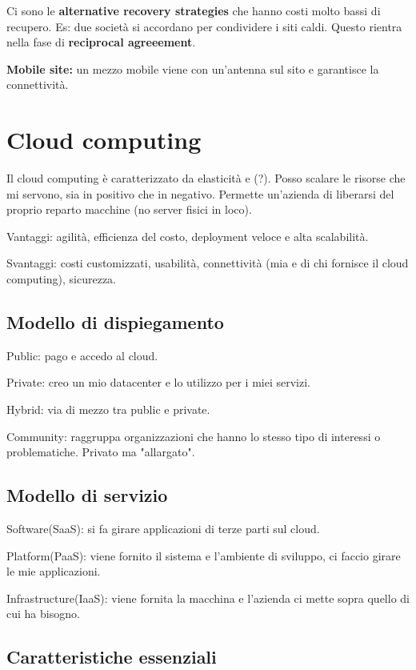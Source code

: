 Ci sono le \textbf{alternative recovery strategies} che hanno costi molto bassi di recupero. Es: due società si accordano per condividere i siti caldi. Questo rientra nella fase di \textbf{reciprocal agreeement}.

\textbf{Mobile site:} un mezzo mobile viene con un'antenna sul sito e garantisce la connettività.

\section{Cloud computing}

Il cloud computing è caratterizzato da elasticità e (?). Posso scalare le risorse che mi servono, sia in positivo che in negativo. Permette un'azienda di liberarsi del proprio reparto macchine (no server fisici in loco).

Vantaggi: agilità, efficienza del costo, deployment veloce e alta scalabilità.

Svantaggi: costi customizzati, usabilità, connettività (mia e di chi fornisce il cloud computing), sicurezza.

\subsection{Modello di dispiegamento}

Public: pago e accedo al cloud.

Private: creo un mio datacenter e lo utilizzo per i miei servizi.

Hybrid: via di mezzo tra public e private.

Community: raggruppa organizzazioni che hanno lo stesso tipo di interessi o problematiche. Privato ma "allargato".

\subsection{Modello di servizio}

Software(SaaS): si fa girare applicazioni di terze parti sul cloud.

Platform(PaaS): viene fornito il sistema e l'ambiente di sviluppo, ci faccio girare le mie applicazioni. 

Infrastructure(IaaS): viene fornita la macchina e l'azienda ci mette sopra quello di cui ha bisogno.

\subsection{Caratteristiche essenziali}

